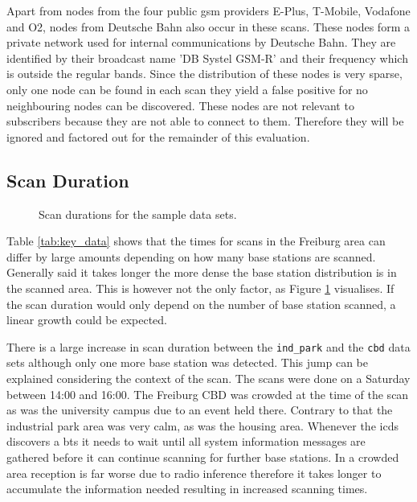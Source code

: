 Apart from nodes from the four public \gls{gsm} providers E-Plus, T-Mobile, Vodafone and O2, nodes from Deutsche Bahn also occur in these scans.
These nodes form a private network used for internal communications by Deutsche Bahn.
They are identified by their broadcast name 'DB Systel GSM-R' and their frequency which is outside the regular bands.
Since the distribution of these nodes is very sparse, only one node can be found in each scan they yield a false positive for no neighbouring nodes can be discovered.
These nodes are not relevant to subscribers because they are not able to connect to them.
Therefore they will be ignored and factored out for the remainder of this evaluation.

\subsection{Scan Duration}
\begin{figure}
\centering
{}
\caption{Scan durations for the sample data sets.}
\label{fig:durations}
\end{figure}
Table \ref{tab:key_data} shows that the times for scans in the Freiburg area can differ by large amounts depending on how many base stations are scanned.
Generally said it takes longer the more dense the base station distribution is in the scanned area.
This is however not the only factor, as Figure \ref{fig:durations} visualises.
If the scan duration would only depend on the number of base station scanned, a linear growth could be expected.

There is a large increase in scan duration between the \texttt{ind\_park} and the \texttt{cbd} data sets although only one more base station was detected.
This jump can be explained considering the context of the scan.
The scans were done on a Saturday between 14:00 and 16:00.
The Freiburg CBD was crowded at the time of the scan as was the university campus due to an event held there.
Contrary to that the industrial park area was very calm, as was the housing area.
Whenever the \gls{icds} discovers a \gls{bts} it needs to wait until all system information messages are gathered before it can continue scanning for further base stations.
In a crowded area reception is far worse due to radio inference therefore it takes longer to accumulate the information needed resulting in increased scanning times.

